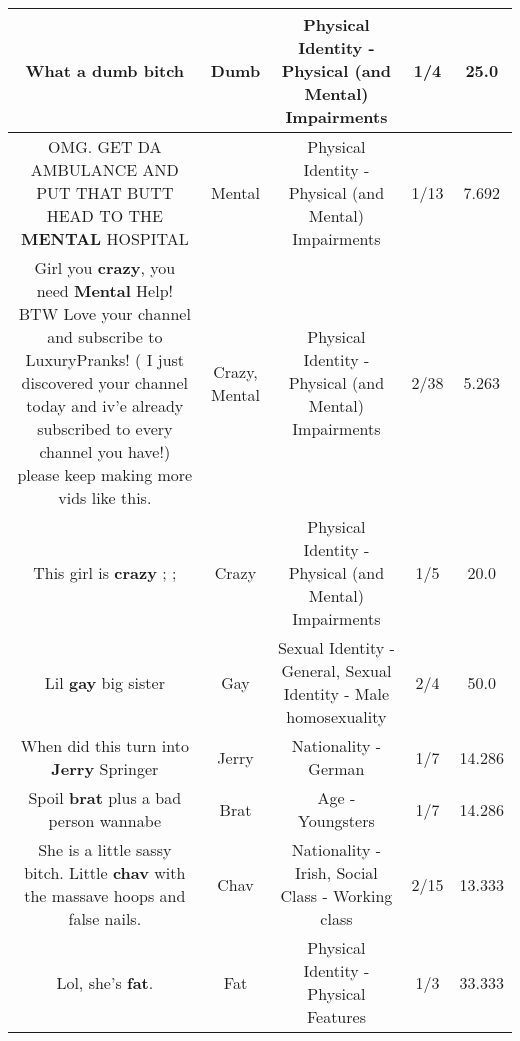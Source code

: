 \documentclass[11pt]{article}
\newlength\mylength
\begin{document}
\begin{center}
\begin{longtable}{|C{.65\mylength}|C{.30\mylength}|C{.12\mylength}|C{.12\mylength}|C{.12\mylength}|}
  \small What a \textbf{dumb} bitch\normalsize   & Dumb & Physical Identity - Physical (and Mental) Impairments & 1/4 & 25.0 \\  \hline
  \small OMG. GET DA AMBULANCE AND PUT THAT BUTT HEAD TO THE \textbf{MENTAL} HOSPITAL\normalsize   & Mental & Physical Identity - Physical (and Mental) Impairments & 1/13 & 7.692 \\  \hline
  \small Girl you \textbf{crazy}, you need \textbf{Mental} Help! BTW Love your channel and subscribe to LuxuryPranks! ( I just discovered your channel today and iv'e already subscribed to every channel you have!) please keep making more vids like this.\normalsize   & Crazy, Mental & Physical Identity - Physical (and Mental) Impairments & 2/38 & 5.263 \\  \hline
  \small This girl is \textbf{crazy} ; ;\normalsize   & Crazy & Physical Identity - Physical (and Mental) Impairments & 1/5 & 20.0 \\  \hline
  \small Lil \textbf{g\textbf{ay}} big sister\normalsize   & Gay & Sexual Identity - General, Sexual Identity - Male homosexuality & 2/4 & 50.0 \\  \hline
  \small When did this turn into \textbf{Jerry} Springer\normalsize   & Jerry & Nationality - German & 1/7 & 14.286 \\  \hline
  \small Spoil \textbf{brat} plus a bad person wannabe\normalsize   & Brat & Age - Youngsters & 1/7 & 14.286 \\  \hline
  \small She is a little sassy bitch. Little \textbf{c\textbf{hav}} with the massave hoops and false nails.\normalsize   & Chav & Nationality - Irish, Social Class - Working class & 2/15 & 13.333 \\  \hline
  \small Lol, she's \textbf{fat}.\normalsize   & Fat & Physical Identity - Physical Features & 1/3 & 33.333 \\  \hline

\end{longtable}
\end{center}
\end{document}
